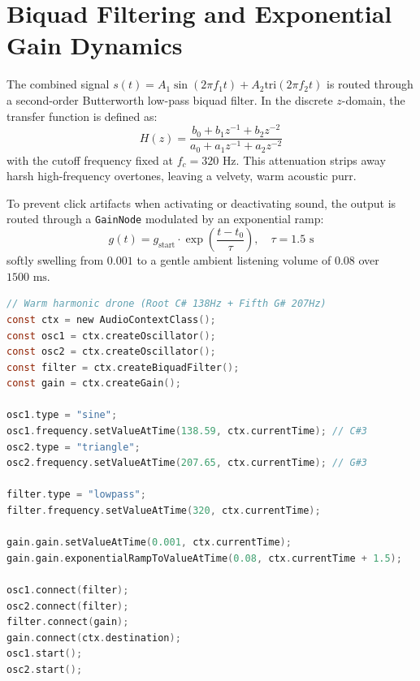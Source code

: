 \documentclass[11pt,a4paper]{report}
\begin{document}
\section{Biquad Filtering and Exponential Gain Dynamics}
The combined signal $s(t) = A_1 \sin(2\pi f_1 t) + A_2 \text{tri}(2\pi f_2 t)$ is routed through a second-order Butterworth low-pass biquad filter. In the discrete $z$-domain, the transfer function is defined as:
\begin{equation}
    H(z) = \frac{b_0 + b_1 z^{-1} + b_2 z^{-2}}{a_0 + a_1 z^{-1} + a_2 z^{-2}}
\end{equation}
with the cutoff frequency fixed at $f_c = 320\text{ Hz}$. This attenuation strips away harsh high-frequency overtones, leaving a velvety, warm acoustic purr.

To prevent click artifacts when activating or deactivating sound, the output is routed through a \texttt{GainNode} modulated by an exponential ramp:
\begin{equation}
    g(t) = g_{\text{start}} \cdot \exp\left( \frac{t - t_0}{\tau} \right), \quad \tau = 1.5\text{ s}
\end{equation}
softly swelling from $0.001$ to a gentle ambient listening volume of $0.08$ over $1500\text{ ms}$.

\begin{lstlisting}[language=C, caption={Procedural Web Audio Hearth Synthesizer in \texttt{BharatDishExperience.tsx}.}]
// Warm harmonic drone (Root C# 138Hz + Fifth G# 207Hz)
const ctx = new AudioContextClass();
const osc1 = ctx.createOscillator();
const osc2 = ctx.createOscillator();
const filter = ctx.createBiquadFilter();
const gain = ctx.createGain();

osc1.type = "sine";
osc1.frequency.setValueAtTime(138.59, ctx.currentTime); // C#3
osc2.type = "triangle";
osc2.frequency.setValueAtTime(207.65, ctx.currentTime); // G#3

filter.type = "lowpass";
filter.frequency.setValueAtTime(320, ctx.currentTime);

gain.gain.setValueAtTime(0.001, ctx.currentTime);
gain.gain.exponentialRampToValueAtTime(0.08, ctx.currentTime + 1.5);

osc1.connect(filter);
osc2.connect(filter);
filter.connect(gain);
gain.connect(ctx.destination);
osc1.start();
osc2.start();
\end{lstlisting}

\end{document}
